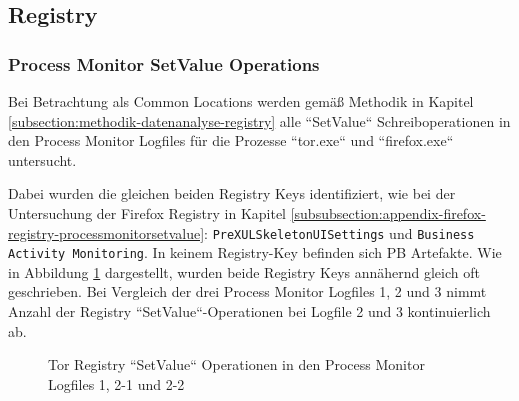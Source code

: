 \begin{appendices}
\subsection{Registry}

\subsubsection*{Process Monitor SetValue Operations}

Bei Betrachtung als Common Locations werden gemäß Methodik in Kapitel \ref{subsection:methodik-datenanalyse-registry} alle ``SetValue`` Schreiboperationen in den Process Monitor Logfiles für die Prozesse ``tor.exe`` und ``firefox.exe`` untersucht. 

Dabei wurden die gleichen beiden Registry Keys identifiziert, wie bei der Untersuchung der Firefox Registry in Kapitel \ref{subsubsection:appendix-firefox-registry-processmonitorsetvalue}: \texttt{PreXULSkeletonUISettings} und \texttt{Business Activity Monitoring}. In keinem Registry-Key befinden sich PB Artefakte.
Wie in Abbildung \ref{chart:tor-registy-css-vs-bam} dargestellt, wurden beide Registry Keys annähernd gleich oft geschrieben. Bei Vergleich der drei Process Monitor Logfiles 1, 2 und 3 nimmt Anzahl der Registry ``SetValue``-Operationen bei Logfile 2 und 3 kontinuierlich ab.

\begin{figure}[h!]
	\caption{Tor Registry ``SetValue`` Operationen in den Process Monitor Logfiles 1, 2-1 und 2-2}
	\label{chart:tor-registy-css-vs-bam}
\end{figure}


\end{appendices}
